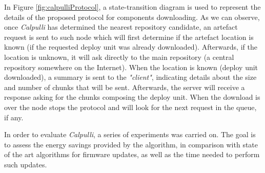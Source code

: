 In Figure \ref{fig:calpulliProtocol}, a state-transition diagram is used to represent the details of the proposed protocol for components downloading.
As we can observe, once \textit{Calpulli} has determined the nearest repository candidate, an artefact request is sent to such node which will first determine if the artefact location is known (if the requested deploy unit was already downloaded). 
Afterwards, if the location is unknown, it will ask directly to the main repository (a central repository somewhere on the Internet).
When the location is known (deploy unit downloaded), a summary is sent to the \textit{"client"}, indicating details about the size and number of chunks that will be sent.
Afterwards, the server will receive a response asking for the chunks composing the deploy unit.
When the download is over the node stops the protocol and will look for the next request in the queue, if any.

In order to evaluate \textit{Calpulli}, a series of experiments was carried on.
The goal is to assess the energy savings provided by the algorithm, in comparison with state of the art algorithms for firmware updates, as well as the time needed to perform such updates.



